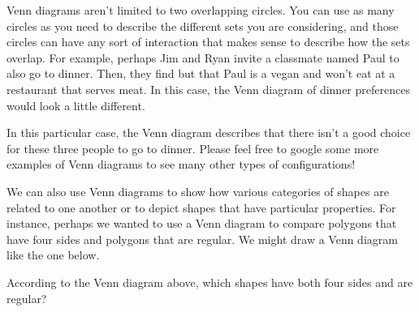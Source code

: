 \documentclass{ximera}
\begin{document}
Venn diagrams aren't limited to two overlapping circles. You can use as many circles as you need to describe the different sets you are considering, and those circles can have any sort of interaction that makes sense to describe how the sets overlap. For example, perhaps Jim and Ryan invite a classmate named Paul to also go to dinner. Then, they find but that Paul is a vegan and won't eat at a restaurant that serves meat. In this case, the Venn diagram of dinner preferences would look a little different.
\begin{center}
\end{center}
In this particular case, the Venn diagram describes that there isn't a good choice for these three people to go to dinner. Please feel free to google some more examples of Venn diagrams to see many other types of configurations!

We can also use Venn diagrams to show how various categories of shapes are related to one another or to depict shapes that have particular properties. For instance, perhaps we wanted to use a Venn diagram to compare polygons that have four sides and polygons that are regular. We might draw a Venn diagram like the one below.

\begin{center}
\end{center}

\begin{question}
According to the Venn diagram above, which shapes have both four sides and are regular?
\begin{selectAll}
\end{selectAll}
\end{question}
\end{document}
